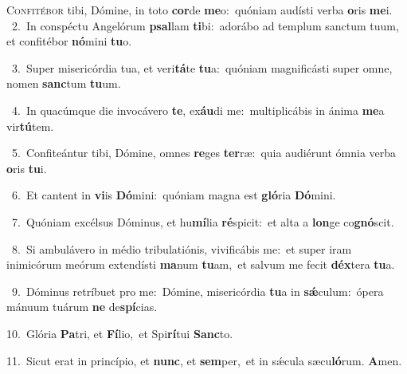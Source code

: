 \lettrine{\initial\textcolor{\initialcolor}{C}}{onfitébor} tibi, Dómine, in toto \textbf{cor}\-de \textbf{me}\-o:~\star quóniam audísti verba \textbf{o}\-ris \textbf{me}\-i.\\
{\numbfont\textcolor{\numbcolor}{~2.}}~In conspéctu Angelórum \textbf{psal}\-lam \textbf{ti}\-bi:~\star adorábo ad templum sanctum tuum, et confitébor \textbf{nó}\-mini \textbf{tu}\-o.\par
{\numbfont\textcolor{\numbcolor}{~3.}}~Super misericórdia tua, et veri\-\textbf{tá}\-te \textbf{tu}\-a:~\star quóniam magnificásti super omne, nomen \textbf{sanc}\-tum \textbf{tu}\-um.\par
{\numbfont\textcolor{\numbcolor}{~4.}}~In quacúmque die invocávero \textbf{te}\-, ex\-\textbf{áu}\-di me:~\star multiplicábis in ánima \textbf{me}\-a vir\-\textbf{tú}\-tem.\par
{\numbfont\textcolor{\numbcolor}{~5.}}~Confiteántur tibi, Dómine, omnes \textbf{re}\-ges \textbf{ter}\-ræ:~\star quia audiérunt ómnia verba \textbf{o}\-ris \textbf{tu}\-i.\par
{\numbfont\textcolor{\numbcolor}{~6.}}~Et cantent in \textbf{vi}\-is \textbf{Dó}\-mini:~\star quóniam magna est \textbf{gló}\-ria \textbf{Dó}\-mini.\par
{\numbfont\textcolor{\numbcolor}{~7.}}~Quóniam excélsus Dóminus, et hu\-\textbf{mí}\-lia \textbf{ré}\-spicit:~\star et alta a \textbf{lon}\-ge co\-\textbf{gnó}\-scit.\par
{\numbfont\textcolor{\numbcolor}{~8.}}~Si ambulávero in médio tribulatiónis, vivificábis me:~\dagger et super iram inimicórum meórum extendísti \textbf{ma}\-num \textbf{tu}\-am,~\star et salvum me fecit \textbf{déx}\-tera \textbf{tu}\-a.\par
{\numbfont\textcolor{\numbcolor}{~9.}}~Dóminus retríbuet pro me:~\dagger Dómine, misericórdia \textbf{tu}\-a in \textbf{sǽ}\-culum:~\star ópera mánuum tuárum \textbf{ne} de\-\textbf{spí}\-cias.\par
{\numbfont\textcolor{\numbcolor}{10.}}~Glória \textbf{Pa}\-tri, et \textbf{Fí}\-lio,~\star et Spi\-\textbf{rí}\-tui \textbf{Sanc}\-to.\par
{\numbfont\textcolor{\numbcolor}{11.}}~Sicut erat in princípio, et \textbf{nunc}\-, et \textbf{sem}\-per,~\star et in sǽcula sæcu\-\textbf{ló}\-rum. \textbf{A}\-men.\par
